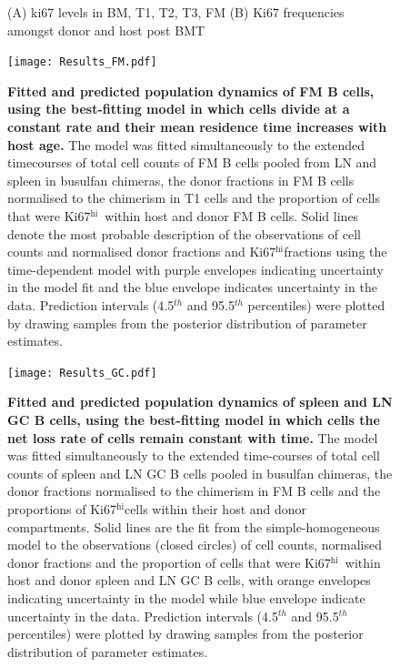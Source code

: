 \documentclass[11pt,onecolumn]{article}
\newcommand{\khi}{Ki67$^\text{hi}$}
\begin{document}
\begin{figure}[htbp] %
   \centering
   \caption{(A) ki67 levels in BM, T1, T2, T3, FM (B) Ki67 frequencies amongst donor and host post BMT }
   \label{fig:Ki67}
\end{figure}


\begin{figure}[h!]
		\centerline{\texttt{[image: Results\_FM.pdf]}}
		\caption{\small \textbf{Fitted and predicted   population dynamics of FM B cells, using the best-fitting model in which cells divide at a constant rate and their mean residence time increases with host age.}  The model was fitted simultaneously to the extended timecourses of total cell counts of FM B cells pooled from LN and spleen in busulfan chimeras, the donor fractions in FM B cells normalised to the chimerism in T1 cells and the proportion of cells that were \khi\ within host and donor FM B cells. Solid lines denote the most probable description of the observations of cell counts and normalised donor fractions and \khi fractions using the time-dependent model with purple envelopes indicating uncertainty in the model fit and the blue envelope indicates uncertainty in the data. Prediction intervals (4.5$^{th}$ and 95.5$^{th}$ percentiles) were plotted by drawing samples from the posterior distribution of parameter estimates.}
		\label{fig:results_FM}
\end{figure}



\begin{figure}[h!]
	\centerline{\texttt{[image: Results\_GC.pdf]}}
	\caption{\small \textbf{Fitted and predicted population dynamics of spleen and LN GC B cells, using the best-fitting model in which cells the net loss rate of cells remain constant with time.}  The model was fitted simultaneously to the extended time-courses of total cell counts of spleen and LN GC B cells pooled in busulfan chimeras, the donor fractions normalised to the chimerism in FM B cells and the proportions of \khi cells within their host and donor compartments. Solid lines are the fit from the simple-homogeneous model to the observations (closed circles) of cell counts, normalised donor fractions and the proportion of cells that were \khi\ within host and donor spleen and LN GC B cells, with orange envelopes indicating uncertainty in the model while blue envelope indicate uncertainty in the data. Prediction intervals (4.5$^{th}$ and 95.5$^{th}$ percentiles) were plotted by drawing samples from the posterior distribution of parameter estimates.}
	\label{fig:results_GC}
\end{figure}
\end{document}
